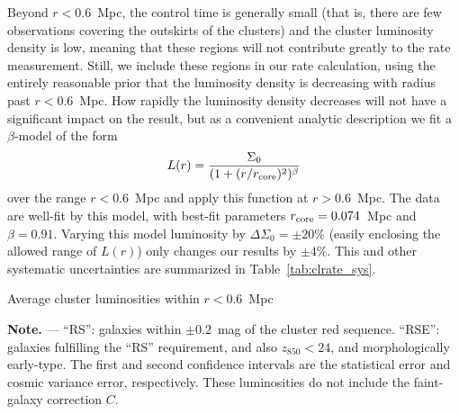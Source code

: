 Beyond $r<0.6$~Mpc, the control time is generally small (that is,
there are few observations covering the outskirts of the clusters) and
the cluster luminosity density is low, meaning that these regions will
not contribute greatly to the rate measurement. Still, we include
these regions in our rate calculation, using the entirely reasonable
prior that the luminosity density is decreasing with radius past
$r<0.6$~Mpc. How rapidly the luminosity density decreases will not
have a significant impact on the result, but as a convenient analytic
description we fit a $\beta$-model of the form
\begin{equation}
L(r) = \frac{\Sigma_0}{(1+(r/r_{\rm core})^2)^\beta}
\end{equation}
over the range $r<0.6$~Mpc and apply this function at $r>0.6$~Mpc. The
data are well-fit by this model, with best-fit parameters $r_{\rm
core} = 0.074$~Mpc and $\beta= 0.91$. Varying this model luminosity by
$\Delta\Sigma_0 = \pm 20\%$ (easily enclosing the allowed range of
$L(r)$) only changes our results by $\pm 4\%$. This and other
systematic uncertainties are summarized in
Table~\ref{tab:clrate_sys}.




\begin{table}[tbhp]
\caption{\label{tab:lum_avg} Average cluster luminosities within $r < 0.6$~Mpc}
\begin{center}

\end{center}
{\footnotesize
{\bf Note.} --- ``RS'': galaxies within $\pm 0.2$~mag
of the cluster red sequence. ``RSE'': galaxies fulfilling the ``RS''
requirement, and also $z_{850} < 24$, and morphologically
early-type. The first and second confidence intervals are the
statistical error and cosmic variance error, respectively. These
luminosities do not include the faint-galaxy correction $C$.}
\end{table}

